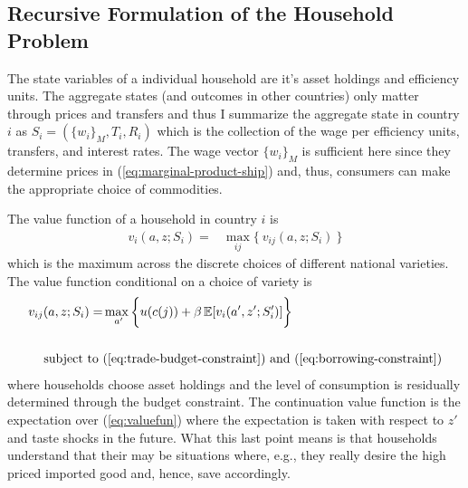 \documentclass[12pt,pdftex]{article}
\begin{document}
\begin{onehalfspacing}
\subsection{Recursive Formulation of the Household Problem}

The state variables of a individual household are it's asset holdings and efficiency units. The aggregate states (and outcomes in other countries) only matter through prices and transfers and thus I summarize the aggregate state in country $i$ as $S_i = (\{ w_i \}_{M}, T_i, R_{i})$ which is the collection of the wage per efficiency units, transfers, and interest rates. The wage vector $\{ w_i \}_{M}$ is sufficient here since they determine prices in (\ref{eq:marginal-product-ship}) and, thus, consumers can make the appropriate choice of commodities.

The value function of a household in country $i$ is
\begin{align}
v_{i}(a, z; S_i) = &  \max_{ij} \big  \{ \  v_{ij}(a, z; S_i)  \ \big \}
\label{eq:valuefun}
\end{align}
which is the maximum across the discrete choices of different national varieties. The value function conditional on a choice of variety is
\begin{align}
v_{ij}(a, z;  S_i  ) = &  \max_{\ a' }\bigg  \{ u(c(j))  + \beta \, \mathbb{E} [v_{i}(a', z'; S_i' )]  \bigg\}
\label{eq:value_fun_option} \\
\nonumber \\
\mbox{subject to}  \ & (\ref{eq:trade-budget-constraint}) \  \mathrm{and} \ (\ref{eq:borrowing-constraint}) \nonumber
\end{align}
where households choose asset holdings and the level of consumption is residually determined through the budget constraint. The continuation value function is the expectation over (\ref{eq:valuefun}) where the expectation is taken with respect to $z'$ and taste shocks in the future. What this last point means is that households understand that their may be situations where, e.g., they really desire the high priced imported good and, hence, save accordingly.


\end{onehalfspacing}
\end{document}
